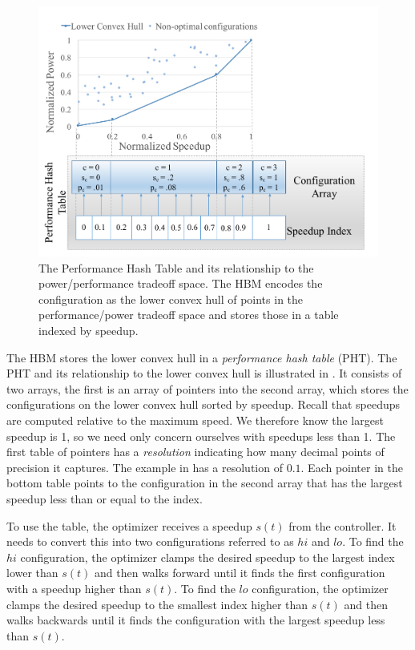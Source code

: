 \begin{figure}
  \includegraphics[width=\columnwidth]{figures/performance-hash-table.pdf}
  \caption{The Performance Hash Table and its relationship to the
    power/performance tradeoff space.  The HBM encodes the
    configuration as the lower convex hull of points in the
    performance/power tradeoff space and stores those in a table
    indexed by speedup.}
  \label{fig:pht}
\end{figure}

The HBM stores the lower convex hull in a \emph{performance hash
  table} (PHT).  The PHT and its relationship to the lower convex hull
is illustrated in .  It consists of two arrays, the
first is an array of pointers into the second array, which stores the
configurations on the lower convex hull sorted by speedup.  Recall
that speedups are computed relative to the maximum speed.  We
therefore know the largest speedup is 1, so we need only concern
ourselves with speedups less than 1.  The first table of pointers has
a \emph{resolution} indicating how many decimal points of precision it
captures.  The example in  has a resolution of $0.1$.
Each pointer in the bottom table points to the configuration in the
second array that has the largest speedup less than or equal to the
index.

To use the table, the optimizer receives a speedup $s(t)$ from the
controller.  It needs to convert this into two configurations referred
to as $hi$ and $lo$.  To find the $hi$ configuration, the optimizer
clamps the desired speedup to the largest index lower than $s(t)$ and
then walks forward until it finds the first configuration with a
speedup higher than $s(t)$.  To find the $lo$ configuration, the
optimizer clamps the desired speedup to the smallest index higher than
$s(t)$ and then walks backwards until it finds the configuration with
the largest speedup less than $s(t)$.

